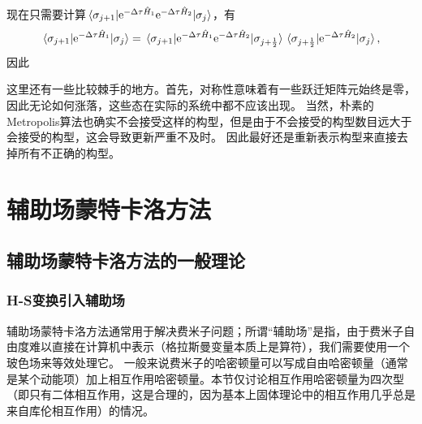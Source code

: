 \documentclass[hyperref, UTF8, a4paper]{ctexart}
\newcommand*{\ee}{\mathrm{e}}
\begin{document}
现在只需要计算$\mel*{\sigma_{j+1}}{\ee^{-\Delta \tau \hat{H}_1} \ee^{-\Delta \tau \hat{H}_2}}{\sigma_j}$，有
\begin{equation}
    \mel*{\sigma_{j+1}}{\ee^{-\Delta \tau \hat{H}_1}}{\sigma_j} = \mel*{\sigma_{j+1}}{\ee^{-\Delta \tau \hat{H}_1} \ee^{-\Delta \tau \hat{H}_2}}{\sigma_{j+\frac{1}{2}}} \mel*{\sigma_{j+\frac{1}{2}}}{\ee^{-\Delta \tau \hat{H}_2}}{\sigma_j},
\end{equation}
因此

这里还有一些比较棘手的地方。首先，对称性意味着有一些跃迁矩阵元始终是零，因此无论如何涨落，这些态在实际的系统中都不应该出现。
当然，朴素的Metropolis算法也确实不会接受这样的构型，但是由于不会接受的构型数目远大于会接受的构型，这会导致更新严重不及时。
因此最好还是重新表示构型来直接去掉所有不正确的构型。

\section{辅助场蒙特卡洛方法}

\subsection{辅助场蒙特卡洛方法的一般理论}

\subsubsection{H-S变换引入辅助场}

辅助场蒙特卡洛方法通常用于解决费米子问题；所谓“辅助场”是指，由于费米子自由度难以直接在计算机中表示（格拉斯曼变量本质上是算符），我们需要使用一个玻色场来等效处理它。
一般来说费米子的哈密顿量可以写成自由哈密顿量（通常是某个动能项）加上相互作用哈密顿量。本节仅讨论相互作用哈密顿量为四次型（即只有二体相互作用，这是合理的，因为基本上固体理论中的相互作用几乎总是来自库伦相互作用）的情况。
\end{document}
